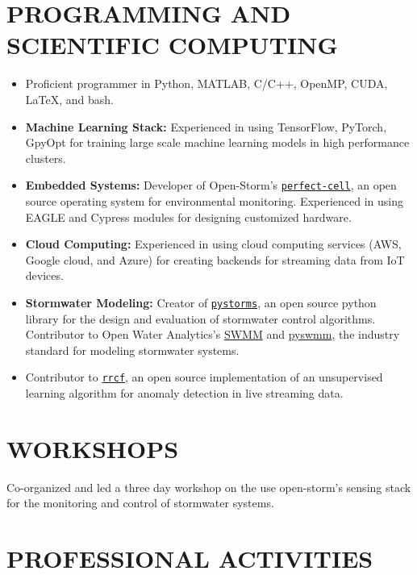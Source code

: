 \documentclass{my_cv}
\begin{document}
\section*{PROGRAMMING AND SCIENTIFIC COMPUTING}

\begin{itemize}
	\item Proficient programmer in Python, MATLAB, C/C++, OpenMP, CUDA, \LaTeX, and bash.
	\item \textbf{Machine Learning Stack:} Experienced in using TensorFlow, PyTorch, GpyOpt for training large scale machine learning models in high performance clusters. 
	\item \textbf{Embedded Systems:} Developer of Open-Storm's \href{https://github.com/open-storm/perfect-cell}{\texttt{perfect-cell}}, an open source operating system for environmental monitoring. Experienced in using EAGLE and Cypress modules for designing customized hardware.  
	\item \textbf{Cloud Computing:} Experienced in using cloud computing services (AWS, Google cloud, and Azure) for creating backends for streaming data from IoT devices. 
	\item \textbf{Stormwater Modeling:} Creator of \href{https://klabum.github.io/pystorms/}{\texttt{pystorms}}, an open source python library for the design and evaluation of stormwater control algorithms. Contributor to Open Water Analytics's \href{https://github.com/OpenWaterAnalytics/Stormwater-Management-Model}{SWMM} and \href{https://github.com/OpenWaterAnalytics/pyswmm}{pyswmm}, the industry standard for modeling stormwater systems. 
	\item Contributor to \href{https://github.com/kLabUM/rrcf}{\texttt{rrcf}}, an open source implementation of an unsupervised learning algorithm for anomaly detection in live streaming data. 
\end{itemize}


\section*{WORKSHOPS}

Co-organized and led a three day workshop on the use open-storm's sensing stack for the monitoring and control of stormwater systems.


\section*{PROFESSIONAL ACTIVITIES}
\end{document}

